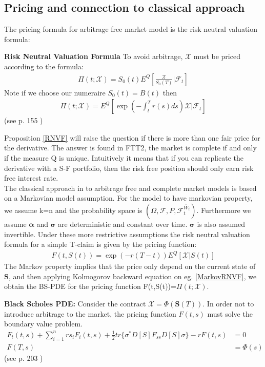 \subsection{Pricing and connection to classical approach}
The pricing formula for arbitrage free market model is the risk neutral valuation formula:
\begin{proposition}{\textbf{Risk Neutral Valuation Formula}}\label{RNVF}
To avoid arbitrage, $\mathcal{X}$ must be priced according to the formula:
\begin{align}
\Pi(t;\mathcal{X})=S_0(t)E^Q[\frac{\mathcal{X}}{S_0(T)}|\mathcal{F}_t]
\end{align}
Note if we choose our numeraire $S_0(t)=B(t)$ then
\begin{align}
\Pi(t;\mathcal{X})=E^Q[\exp(-\int_t^T r(s) ds) \mathcal{X}|\mathcal{F}_t]
\end{align}
(see p. 155 \parencite{finKont})
\end{proposition}
Proposition \ref{RNVF} will raise the question if there is more than one fair price for the derivative. The answer is found in FTT2, the market is complete if and only if the measure Q is unique. Intuitively it means that if you can replicate the derivative with a S-F portfolio, then the risk free position should only earn risk free interest rate. \\

The classical approach in \parencite{B-S-Paper} to arbitrage free and complete market models is based on a Markovian model assumption. For the model to have markovian property, we assume k=n and the probability space is $(\Omega, \mathcal{F}, P, \mathcal{F}_t^{\bar{W}_t})$. Furthermore we assume $\bm{\alpha}$ and $\bm{\sigma}$ are deterministic and constant over time. $\bm{\sigma}$ is also assumed invertible. Under these more restrictive assumptions the risk neutral valuation formula for a simple T-claim is given by the pricing function:
\begin{align}\label{MarkovRNVF}
F(t,S(t))=\exp(-r(T-t))E^Q[\mathcal{X}|S(t)]
\end{align}
The Markov property implies that the price only depend on the current state of $\bm{S}$, and then applying Kolmogorov backward equation on eg. \ref{MarkovRNVF}, we obtain the BS-PDE for the pricing function F(t,S(t))=$\Pi(t; \mathcal{X})$.

\begin{theorem}\label{BSPDEMultiDim}
\textbf{Black Scholes PDE: } Consider the contract $\mathcal{X}=\Phi(\bm{S}(T))$. In order not to introduce arbitrage to the market, the pricing function $F(t,s)$ must solve the boundary value problem.
\begin{equation}
\begin{split}
F_t(t,s)+\sum_{i=1}^{n} rs_iF_i(t,s)+\frac{1}{2} tr\{\sigma^* D[S] F_{ss} D[S] \sigma\} -rF(t,s)&=0\\
F(T,s)&=\Phi(s)
\end{split}
\end{equation}
(see p. 203 \parencite{finKont})
\end{theorem}


